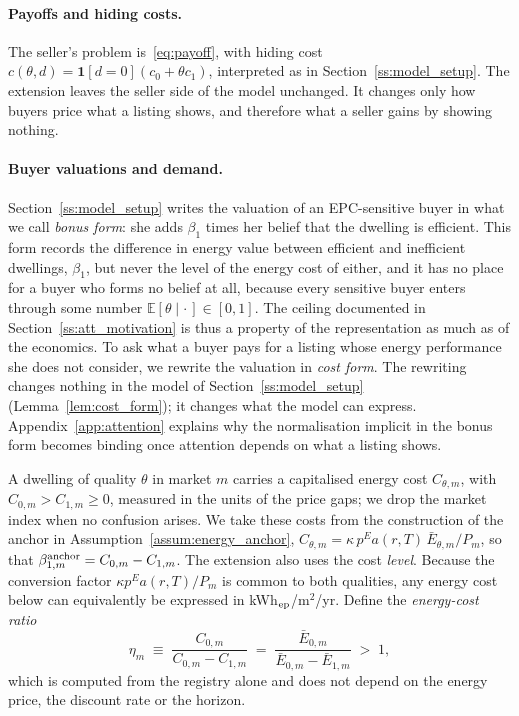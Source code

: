\paragraph{Payoffs and hiding costs.}
The seller's problem is~\eqref{eq:payoff}, with hiding cost $c(\theta,d)=\mathbf 1[d=0](c_0+\theta c_1)$, interpreted as in Section~\ref{ss:model_setup}. The extension leaves the seller side of the model unchanged. It changes only how buyers price what a listing shows, and therefore what a seller gains by showing nothing.

\paragraph{Buyer valuations and demand.}
Section~\ref{ss:model_setup} writes the valuation of an EPC-sensitive buyer in what we call \emph{bonus form}: she adds $\beta_1$ times her belief that the dwelling is efficient. This form records the difference in energy value between efficient and inefficient dwellings, $\beta_1$, but never the level of the energy cost of either, and it has no place for a buyer who forms no belief at all, because every sensitive buyer enters through some number $\mathbb E[\theta\mid\cdot\,]\in[0,1]$. The ceiling documented in Section~\ref{ss:att_motivation} is thus a property of the representation as much as of the economics. To ask what a buyer pays for a listing whose energy performance she does not consider, we rewrite the valuation in \emph{cost form}. The rewriting changes nothing in the model of Section~\ref{ss:model_setup} (Lemma~\ref{lem:cost_form}); it changes what the model can express. Appendix~\ref{app:attention} explains why the normalisation implicit in the bonus form becomes binding once attention depends on what a listing shows.

A dwelling of quality $\theta$ in market $m$ carries a capitalised energy cost $C_{\theta,m}$, with $C_{0,m}>C_{1,m}\ge0$, measured in the units of the price gaps; we drop the market index when no confusion arises. We take these costs from the construction of the anchor in Assumption~\ref{assum:energy_anchor}, $C_{\theta,m}=\kappa\,p^E a(r,T)\,\bar E_{\theta,m}/P_m$, so that $\beta^{\rm anchor}_{1,m}=C_{0,m}-C_{1,m}$. The extension also uses the cost \emph{level}. Because the conversion factor $\kappa p^Ea(r,T)/P_m$ is common to both qualities, any energy cost below can equivalently be expressed in kWh$_{\rm ep}$/m$^2$/yr. Define the \emph{energy-cost ratio}
\begin{equation}
    \eta_m\;\equiv\;\frac{C_{0,m}}{C_{0,m}-C_{1,m}}\;=\;\frac{\bar E_{0,m}}{\bar E_{0,m}-\bar E_{1,m}}\;>\;1,
    \label{eq:eta}
\end{equation}
which is computed from the registry alone and does not depend on the energy price, the discount rate or the horizon.

